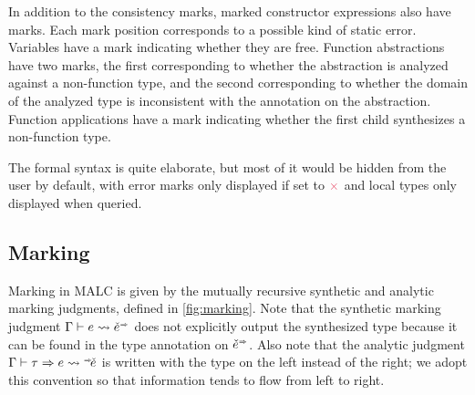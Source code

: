 \documentclass[acmsmall,dvipsnames,10pt,nonacm]{acmart}\settopmatter{printfolios=true} %
\newcommand{\TV}{\ensuremath{\tau}}
\newcommand{\DV}{\ensuremath{\sigma}}
\newcommand{\ctx}{\ensuremath{\Gamma}}
\newcommand{\MV}{\ensuremath{m}}
\newcommand{\MBad}{\ensuremath{{\color{myred}\times}}}
\newcommand{\BEV}{\ensuremath{e}}
\newcommand{\MEUName}{{\normalfont\textsf{MarkedSynExp}}}
\newcommand{\MEUV}{\ensuremath{\check{e}^{\Syn}}}
\newcommand{\MELName}{{\normalfont\textsf{MarkedAnaExp}}}
\newcommand{\MELV}{\ensuremath{\vphantom{a}^{\Syn\hspace{-2px}}\check{e}}}
\newcommand{\MPV}{\ensuremath{\check{p}}}
\newcommand{\Syn}{\ensuremath{\mathsmaller{\Rightarrow}}}
\newcommand{\MarkSyn}[3][\ctx]{#1\vdash#2\leadsto#3}
\newcommand{\MarkAna}[4][\ctx]{#1\vdash#2\Rightarrow#3\leadsto#4}
\newcommand{\MarkProg}[2]{#1\leadsto#2}
\begin{document}


In addition to the consistency marks, marked constructor expressions also have marks. Each mark position corresponds to a possible kind of static error. Variables have a mark indicating whether they are free. Function abstractions have two marks, the first corresponding to whether the abstraction is analyzed against a non-function type, and the second corresponding to whether the domain of the analyzed type is inconsistent with the annotation on the abstraction. Function applications have a mark indicating whether the first child synthesizes a non-function type. 

The formal syntax is quite elaborate, but most of it would be hidden from the user by default, with error marks only displayed if set to $\MBad$ and local types only displayed when queried.

\subsection{Marking}
Marking in MALC is given by the mutually recursive synthetic and analytic marking judgments, defined in \autoref{fig:marking}. Note that the synthetic marking judgment $\MarkSyn{\BEV}{\MEUV}$ does not explicitly output the synthesized type because it can be found in the type annotation on $\MEUV$. Also note that the analytic judgment $\MarkAna{\TV}{\BEV}{\MELV}$ is written with the type on the left instead of the right; we adopt this convention so that information tends to flow from left to right.  
\end{document}

